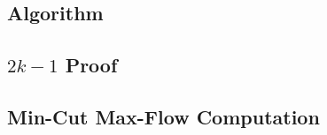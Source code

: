 \subsection{Algorithm}
\label{sec:wfalg}


\subsection{$2k-1$ Proof}
\label{sec:2k1p}


\subsection{Min-Cut Max-Flow Computation}
\label{sec:mcfp}
